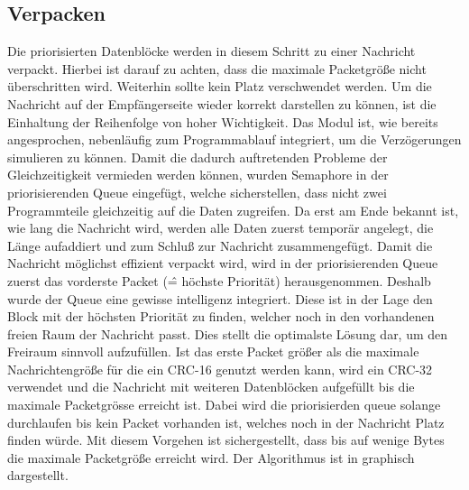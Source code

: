 
\subsection{Verpacken}

Die priorisierten Datenblöcke werden in diesem Schritt zu einer Nachricht
verpackt. Hierbei ist darauf zu achten, dass die maximale Packetgröße
nicht überschritten wird. Weiterhin sollte kein Platz verschwendet werden.
Um die Nachricht auf der Empfängerseite wieder korrekt darstellen zu können, ist die
Einhaltung der Reihenfolge von hoher Wichtigkeit. \newline
Das Modul ist, wie bereits angesprochen, nebenläufig zum Programmablauf
integriert, um die Verzögerungen simulieren zu können. Damit die
dadurch auftretenden Probleme der Gleichzeitigkeit vermieden werden können,
wurden Semaphore in der priorisierenden Queue eingefügt, welche sicherstellen,
dass nicht zwei Programmteile gleichzeitig auf die Daten zugreifen. Da erst
am Ende bekannt ist, wie lang die Nachricht wird, werden alle Daten zuerst
temporär angelegt, die Länge aufaddiert und zum Schluß zur Nachricht
zusammengefügt.
Damit die Nachricht möglichst effizient verpackt wird, wird in der
priorisierenden Queue zuerst das vorderste Packet (\^= höchste Priorität)
herausgenommen. Deshalb wurde der Queue eine gewisse intelligenz integriert.
Diese ist in der Lage den Block mit der höchsten Priorität zu finden, welcher
noch in den vorhandenen freien Raum der Nachricht passt. Dies stellt die
optimalste Lösung dar, um den Freiraum sinnvoll aufzufüllen. \newline 
Ist das erste Packet größer als die maximale Nachrichtengröße für die ein CRC-16
genutzt werden kann, wird ein CRC-32 verwendet und die Nachricht mit weiteren
Datenblöcken aufgefüllt bis die maximale Packetgrösse erreicht ist. Dabei wird
die priorisierden queue solange durchlaufen bis kein Packet vorhanden ist,
welches noch in der Nachricht Platz finden würde. Mit diesem Vorgehen ist
sichergestellt, dass bis auf wenige Bytes die maximale Packetgröße erreicht
wird. \newline 
Der Algorithmus ist in  graphisch dargestellt.

